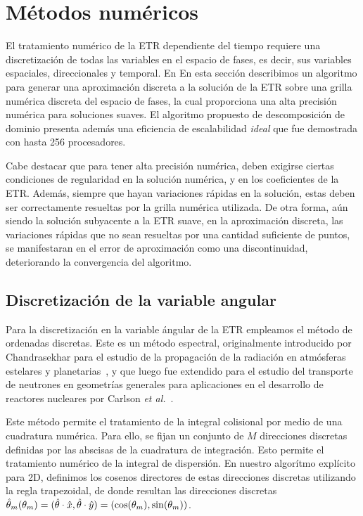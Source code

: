 \section{Métodos numéricos}
\label{sec:nummet}

El tratamiento numérico de la ETR dependiente del tiempo
requiere una discretización de todas las variables en el espacio de fases,
 es decir, sus variables espaciales, direccionales y temporal. En
En esta sección describimos un algoritmo para generar una 
aproximación discreta a la solución de la ETR sobre una 
grilla numérica discreta del 
espacio de fases, la cual proporciona una alta precisión numérica 
para soluciones suaves. El algoritmo propuesto 
de descomposición de dominio presenta además una eficiencia 
de escalabilidad \textit{ideal} 
que fue demostrada con hasta 256 procesadores. 

Cabe destacar que para tener alta precisión numérica, 
deben exigirse ciertas condiciones de regularidad 
en la solución numérica, y en los coeficientes 
de la ETR. Además, siempre que hayan variaciones 
rápidas en la solución, estas deben ser correctamente 
resueltas por la grilla numérica utilizada. De 
otra forma, aún siendo la solución subyacente 
a la ETR suave, en la aproximación discreta, 
las variaciones rápidas que no sean resueltas 
por una cantidad suficiente de puntos, se manifestaran 
en el error de aproximación como una discontinuidad, 
deteriorando la convergencia del algoritmo. 

\subsection{Discretización de la variable angular}
\label{sec:dord}
Para la discretización en la variable ángular de la ETR empleamos el
método de ordenadas discretas. Este es un método espectral, 
originalmente introducido por Chandrasekhar 
para el estudio de la propagación de la radiación en atmósferas 
estelares y planetarias~\cite{Chandrasekhar1960}, 
y que luego fue extendido para el estudio 
del transporte de neutrones en geometrías generales 
para aplicaciones en el desarrollo de reactores nucleares  
por Carlson \textit{et al.}~\cite{Lathrop1992}. 

Este método permite el tratamiento de la integral colisional por medio de una 
cuadratura numérica. Para ello, se fijan 
un conjunto de $M$ direcciones discretas 
definidas por las abscisas 
de la cuadratura de integración. Esto permite el tratamiento 
numérico de la integral 
de dispersión. 
En nuestro algorítmo explícito para 2D, definimos los cosenos directores de 
estas direcciones discretas utilizando la regla trapezoidal, 
de donde resultan las direcciones discretas 
$\hat{\theta}_m(\theta_m)=(\hat{\theta}\cdot \hat x,\hat{\theta}\cdot \hat y)=(\cos(\theta_m),\sin(\theta_m))$.

